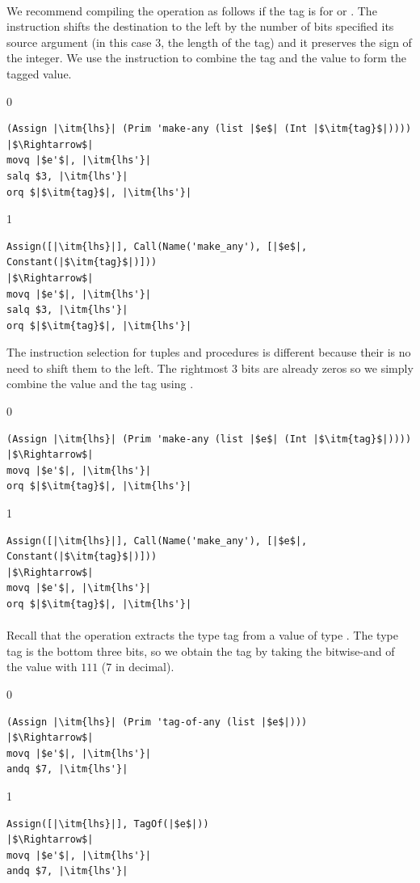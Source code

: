 \documentclass[7x10,nocrop]{TimesAPriori_MIT}%
\def\racketEd{0}
\def\pythonEd{1}
\def\edition{0}
\begin{document}
\paragraph{}

We recommend compiling the  operation as follows if
the tag is for \INTTY{} or \BOOLTY{}.  The  instruction
shifts the destination to the left by the number of bits specified its
source argument (in this case $3$, the length of the tag) and it
preserves the sign of the integer. We use the  instruction to
combine the tag and the value to form the tagged value.  \\
%
{\if\edition\racketEd
\begin{lstlisting}
(Assign |\itm{lhs}| (Prim 'make-any (list |$e$| (Int |$\itm{tag}$|))))
|$\Rightarrow$|
movq |$e'$|, |\itm{lhs'}|
salq $3, |\itm{lhs'}|
orq $|$\itm{tag}$|, |\itm{lhs'}|
\end{lstlisting}
\fi}
%
{\if\edition\pythonEd
\begin{lstlisting}
Assign([|\itm{lhs}|], Call(Name('make_any'), [|$e$|, Constant(|$\itm{tag}$|)]))
|$\Rightarrow$|
movq |$e'$|, |\itm{lhs'}|
salq $3, |\itm{lhs'}|
orq $|$\itm{tag}$|, |\itm{lhs'}|
\end{lstlisting}
\fi}
%
The instruction selection for tuples and procedures is different
because their is no need to shift them to the left. The rightmost 3
bits are already zeros so we simply combine the value and the tag
using .  \\
%
{\if\edition\racketEd
\begin{lstlisting}
(Assign |\itm{lhs}| (Prim 'make-any (list |$e$| (Int |$\itm{tag}$|))))
|$\Rightarrow$|
movq |$e'$|, |\itm{lhs'}|
orq $|$\itm{tag}$|, |\itm{lhs'}|
\end{lstlisting}
\fi}
%
{\if\edition\pythonEd
\begin{lstlisting}
Assign([|\itm{lhs}|], Call(Name('make_any'), [|$e$|, Constant(|$\itm{tag}$|)]))
|$\Rightarrow$|
movq |$e'$|, |\itm{lhs'}|
orq $|$\itm{tag}$|, |\itm{lhs'}|
\end{lstlisting}
\fi}

\paragraph{}

Recall that the  operation extracts the type tag from a
value of type \ANYTY{}. The type tag is the bottom three bits, so we
obtain the tag by taking the bitwise-and of the value with $111$ ($7$
in decimal).
%
{\if\edition\racketEd
\begin{lstlisting}
(Assign |\itm{lhs}| (Prim 'tag-of-any (list |$e$|)))
|$\Rightarrow$|
movq |$e'$|, |\itm{lhs'}|
andq $7, |\itm{lhs'}|
\end{lstlisting}
\fi}
%
{\if\edition\pythonEd
\begin{lstlisting}
Assign([|\itm{lhs}|], TagOf(|$e$|))
|$\Rightarrow$|
movq |$e'$|, |\itm{lhs'}|
andq $7, |\itm{lhs'}|
\end{lstlisting}
\fi}
\end{document}
